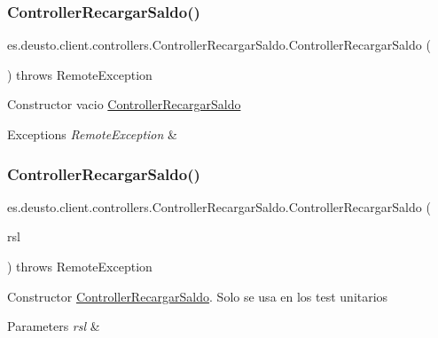 \subsubsection{\texorpdfstring{ControllerRecargarSaldo()}{ControllerRecargarSaldo()}\hspace{0.1cm}{\footnotesize\ttfamily [1/2]}}
{\footnotesize\ttfamily es.\+deusto.\+client.\+controllers.\+Controller\+Recargar\+Saldo.\+Controller\+Recargar\+Saldo (\begin{DoxyParamCaption}{ }\end{DoxyParamCaption}) throws Remote\+Exception}

Constructor vacio \mbox{\hyperlink{classes_1_1deusto_1_1client_1_1controllers_1_1_controller_recargar_saldo}{Controller\+Recargar\+Saldo}} 
\begin{DoxyExceptions}{Exceptions}
{\em Remote\+Exception} & \\
\hline
\end{DoxyExceptions}
\mbox{\label{classes_1_1deusto_1_1client_1_1controllers_1_1_controller_recargar_saldo_a40fae2159dce1094140f0fc1c84735e8}} 
\subsubsection{\texorpdfstring{ControllerRecargarSaldo()}{ControllerRecargarSaldo()}\hspace{0.1cm}{\footnotesize\ttfamily [2/2]}}
{\footnotesize\ttfamily es.\+deusto.\+client.\+controllers.\+Controller\+Recargar\+Saldo.\+Controller\+Recargar\+Saldo (\begin{DoxyParamCaption}\item[{\mbox{\hyperlink{classes_1_1deusto_1_1client_1_1remote_1_1_service_locator}{Service\+Locator}}}]{rsl }\end{DoxyParamCaption}) throws Remote\+Exception}

Constructor \mbox{\hyperlink{classes_1_1deusto_1_1client_1_1controllers_1_1_controller_recargar_saldo}{Controller\+Recargar\+Saldo}}. Solo se usa en los test unitarios 
\begin{DoxyParams}{Parameters}
{\em rsl} & \\
\hline
\end{DoxyParams}

